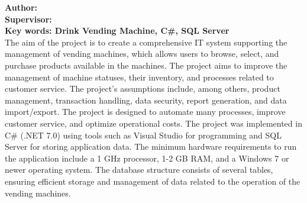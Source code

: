 {\vspace{30pt}
\noindent
\textbf{Author: \autor
\\Supervisor: \promotor
\\Key words: Drink Vending Machine, C\#, SQL Server}
\vspace{40pt}
\\The aim of the project is to create a comprehensive IT system supporting the management of vending machines, which allows users to browse, select, and purchase products available in the machines. The project aims to improve the management of machine statuses, their inventory, and processes related to customer service. The project's assumptions include, among others, product management, transaction handling, data security, report generation, and data import/export. The project is designed to automate many processes, improve customer service, and optimize operational costs. \newline
The project was implemented in C\# (.NET 7.0) using tools such as Visual Studio for programming and SQL Server for storing application data. The minimum hardware requirements to run the application include a 1 GHz processor, 1-2 GB RAM, and a Windows 7 or newer operating system. \newline
The database structure consists of several tables, ensuring efficient storage and management of data related to the operation of the vending machines.
}
